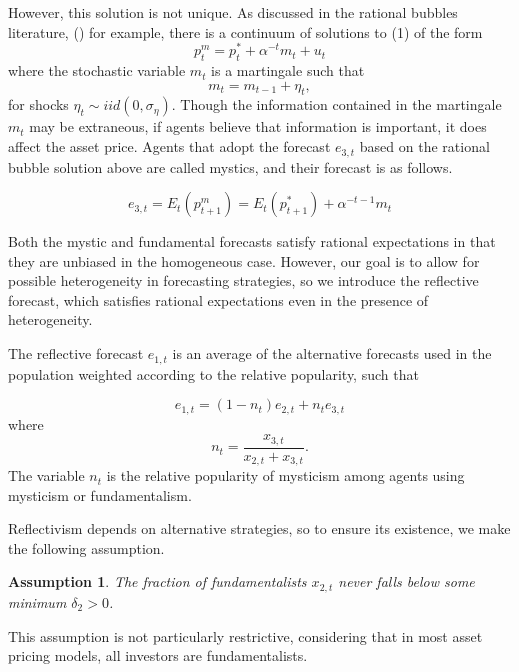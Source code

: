 \documentclass[12pt]{article}
\newtheorem{assumption}{Assumption}
\begin{document}
However, this solution is not unique. As discussed in the rational bubbles literature, \citeauthor{evans1991pitfalls} (\citeyear{evans1991pitfalls}) for example, there is a continuum of solutions to (1) of the form
\[
p_{t}^{m}=p_{t}^{*}+\alpha^{-t} m_{t}+u_{t}
\]
where the stochastic variable $m_{t}$ is a martingale such that 
\begin{equation}
 m_{t}=m_{t-1}+\eta_{t},
 \label{m}
\end{equation}
for shocks $\eta_{t}\sim iid(0,\sigma_{\eta})$. Though the information contained in the martingale $m_{t}$ may be extraneous, if agents believe that information is important, it does affect the asset price. Agents that adopt the forecast $e_{3, t}$ based on the rational bubble solution above are called mystics, and their forecast is as follows.


\begin{equation*}
e_{3, t}=E_{t}\left(p_{t+1}^{m}\right)=E_{t}\left(p_{t+1}^{*}\right)+\alpha^{-t-1} m_{t} \label{myst}
\end{equation*}

Both the mystic and fundamental forecasts satisfy rational expectations in that they are unbiased in the homogeneous case. However, our goal is to allow for possible heterogeneity in forecasting strategies, so we introduce the reflective forecast, which satisfies rational expectations even in the presence of heterogeneity. 

The reflective forecast $e_{1, t}$ is an average of the alternative forecasts used in the population weighted according to the relative popularity, such that

\begin{equation*}
e_{1, t}=\left(1-n_{t}\right) e_{2, t}+n_{t} e_{3, t} \label{refl}
\end{equation*}
where
\[
n_{t}=\frac{x_{3, t}}{x_{2, t}+x_{3, t}}.
\]
The variable $n_{t}$ is the relative popularity of mysticism among agents using mysticism or fundamentalism.

Reflectivism depends on alternative strategies, so to ensure its existence, we make the following assumption.

\begin{assumption} The fraction of fundamentalists $x_{2, t}$ never falls below some minimum $\delta_{2}>0$.
\end{assumption}
This assumption is not particularly restrictive, considering that in most asset pricing models, all investors are fundamentalists.
\end{document}
